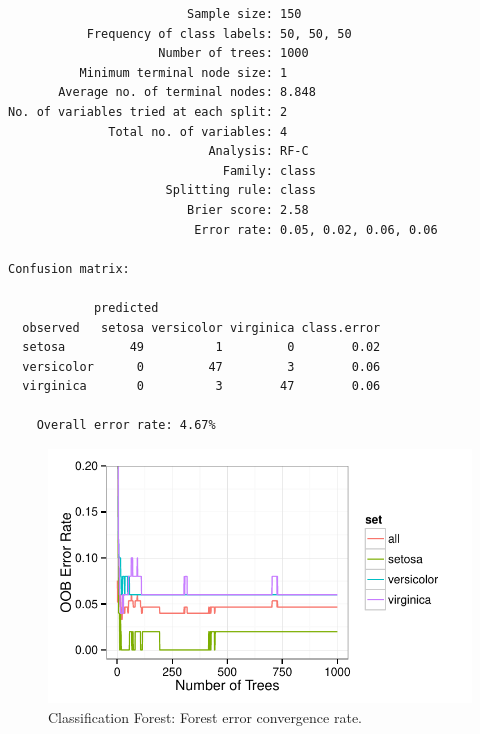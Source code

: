\documentclass[nojss]{jss}\usepackage[]{graphicx}\usepackage[]{color}
\makeatletter
\def\maxwidth{ %
  \ifdim\Gin@nat@width>\linewidth
    \linewidth
  \else
    \Gin@nat@width
  \fi
}
\newenvironment{kframe}{%
 \def\at@end@of@kframe{}%
 \ifinner\ifhmode%
  \def\at@end@of@kframe{\end{minipage}}%
  \begin{minipage}{\columnwidth}%
 \fi\fi%
 \def\FrameCommand##1{\hskip\@totalleftmargin \hskip-\fboxsep
 \colorbox{shadecolor}{##1}\hskip-\fboxsep
     \hskip-\linewidth \hskip-\@totalleftmargin \hskip\columnwidth}%
 \MakeFramed {\advance\hsize-\width
   \@totalleftmargin\z@ \linewidth\hsize
   \@setminipage}}%
 {\par\unskip\endMakeFramed%
 \at@end@of@kframe}
\newenvironment{knitrout}{}{} %
\makeatother
\begin{document}
\begin{knitrout}\footnotesize
{}\color{fgcolor}\begin{kframe}
\begin{verbatim}
                         Sample size: 150
           Frequency of class labels: 50, 50, 50
                     Number of trees: 1000
          Minimum terminal node size: 1
       Average no. of terminal nodes: 8.848
No. of variables tried at each split: 2
              Total no. of variables: 4
                            Analysis: RF-C
                              Family: class
                      Splitting rule: class
                         Brier score: 2.58 
                          Error rate: 0.05, 0.02, 0.06, 0.06

Confusion matrix:

            predicted
  observed   setosa versicolor virginica class.error
  setosa         49          1         0        0.02
  versicolor      0         47         3        0.06
  virginica       0          3        47        0.06

	Overall error rate: 4.67% 
\end{verbatim}
\end{kframe}\begin{figure}[!htpb]

{\centering \includegraphics[width=\maxwidth]{figure/vig-iris-rf-error-1} 

}

\caption[Classification Forest]{Classification Forest: Forest error convergence rate.\label{fig:iris-rf-error}}
\end{figure}


\end{knitrout}
\end{document}
